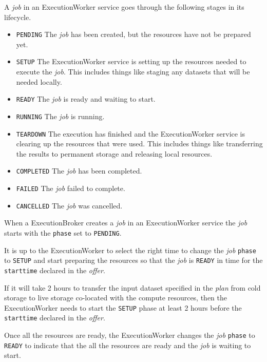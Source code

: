 \documentclass[11pt,a4paper]{ivoa}
\newcommand{\execbrokerclass} {ExecutionBroker}
\newcommand{\execworkerclass} {ExecutionWorker}
\newcommand{\codeword}[1] {\texttt{#1}}
\newcommand{\dataset}[1] {dataset#1}
\newcommand{\execplan} {\textit{plan}}
\newcommand{\execoffer} {\textit{offer}}
\newcommand{\workerjob} {\textit{job}}
\begin{document}
A \workerjob{} in an \execworkerclass{} service goes through the following stages in its lifecycle.

\begin{itemize}
    \item \codeword{PENDING}   The \workerjob{} has been created, but the resources have not be prepared yet.
    \item \codeword{SETUP}     The \execworkerclass{} service is setting up the resources needed to execute the \workerjob{}.
                               This includes things like staging any \dataset{s} that will be needed locally.
    \item \codeword{READY}     The \workerjob{} is ready and waiting to start.
    \item \codeword{RUNNING}   The \workerjob{} is running.
    \item \codeword{TEARDOWN}  The execution has finished and the \execworkerclass{} service is clearing up the resources that were used.
                               This includes things like transferring the results to permanent storage and releasing local resources.
    \item \codeword{COMPLETED} The \workerjob{} has been completed.
    \item \codeword{FAILED}    The \workerjob{} failed to complete.
    \item \codeword{CANCELLED} The \workerjob{} was cancelled.
\end{itemize}

When a \execbrokerclass{} creates a \workerjob{} in an \execworkerclass{} service the
\workerjob{} starts with the \codeword{phase} set to \codeword{PENDING}.

It is up to the \execworkerclass{} to select the right time to change the \workerjob{}
\codeword{phase} to \codeword{SETUP} and start preparing the resources so that
the \workerjob{} is \codeword{READY} in time for the \codeword{starttime} declared
in the \execoffer{}.

If it will take 2 hours to transfer the input \dataset{} specified in the \execplan{}
from cold storage to live storage co-located with the compute resources,
then the \execworkerclass{} needs to start the \codeword{SETUP} phase at least 2 hours
before the \codeword{starttime} declared in the \execoffer{}.

Once all the resources are ready, the \execworkerclass{} changes the \workerjob{}
\codeword{phase} to \codeword{READY} to indicate that the all the resources
are ready and the \workerjob{} is waiting to start.
\end{document}
